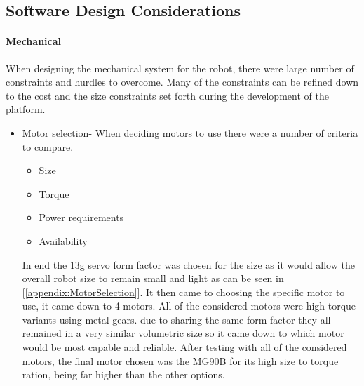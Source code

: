 \documentclass[conference]{IEEEtran}
\begin{document}
\subsection{Software Design Considerations}
\paragraph*{Mechanical}
    When designing the mechanical system for the robot, there were large number of constraints and hurdles to overcome. Many of the constraints can be refined down to the cost and the size constraints set forth during the development of the platform. 
    \begin{itemize}
        \item Motor selection- 
            When deciding motors to use there were a number of criteria to compare. 
            \begin{itemize}
                \item Size
                \item Torque
                \item Power requirements
                \item Availability
            \end{itemize}
            In end the 13g servo form factor was chosen for the size as it would allow the overall robot size to remain small and light as can be seen in [\ref{appendix:MotorSelection}]. It then came to choosing the specific motor to use, it came down to 4 motors. All of the considered motors were high torque variants using metal gears. due to sharing the same form factor they all remained in a very similar volumetric size so it came down to which motor would be most capable and reliable. After testing with all of the considered motors, the final motor chosen was the MG90B for its high size to torque ration, being far higher than the other options.\newline
        

\end{itemize}
\end{document}
